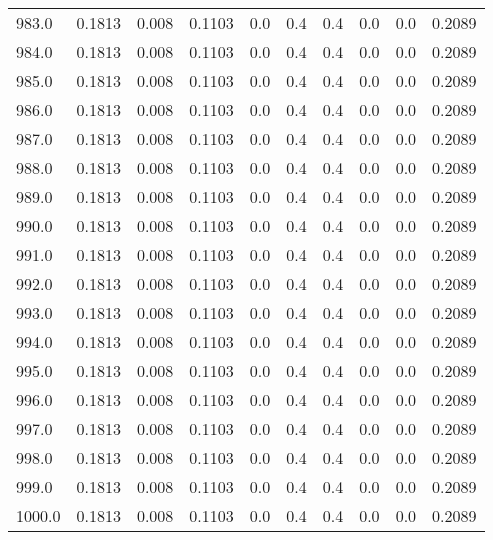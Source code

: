 \begin{longtable}{lrrrrrrrrr}
983.0 & 0.1813 & 0.008 & 0.1103 & 0.0 & 0.4 & 0.4 & 0.0 & 0.0 & 0.2089 \\
984.0 & 0.1813 & 0.008 & 0.1103 & 0.0 & 0.4 & 0.4 & 0.0 & 0.0 & 0.2089 \\
985.0 & 0.1813 & 0.008 & 0.1103 & 0.0 & 0.4 & 0.4 & 0.0 & 0.0 & 0.2089 \\
986.0 & 0.1813 & 0.008 & 0.1103 & 0.0 & 0.4 & 0.4 & 0.0 & 0.0 & 0.2089 \\
987.0 & 0.1813 & 0.008 & 0.1103 & 0.0 & 0.4 & 0.4 & 0.0 & 0.0 & 0.2089 \\
988.0 & 0.1813 & 0.008 & 0.1103 & 0.0 & 0.4 & 0.4 & 0.0 & 0.0 & 0.2089 \\
989.0 & 0.1813 & 0.008 & 0.1103 & 0.0 & 0.4 & 0.4 & 0.0 & 0.0 & 0.2089 \\
990.0 & 0.1813 & 0.008 & 0.1103 & 0.0 & 0.4 & 0.4 & 0.0 & 0.0 & 0.2089 \\
991.0 & 0.1813 & 0.008 & 0.1103 & 0.0 & 0.4 & 0.4 & 0.0 & 0.0 & 0.2089 \\
992.0 & 0.1813 & 0.008 & 0.1103 & 0.0 & 0.4 & 0.4 & 0.0 & 0.0 & 0.2089 \\
993.0 & 0.1813 & 0.008 & 0.1103 & 0.0 & 0.4 & 0.4 & 0.0 & 0.0 & 0.2089 \\
994.0 & 0.1813 & 0.008 & 0.1103 & 0.0 & 0.4 & 0.4 & 0.0 & 0.0 & 0.2089 \\
995.0 & 0.1813 & 0.008 & 0.1103 & 0.0 & 0.4 & 0.4 & 0.0 & 0.0 & 0.2089 \\
996.0 & 0.1813 & 0.008 & 0.1103 & 0.0 & 0.4 & 0.4 & 0.0 & 0.0 & 0.2089 \\
997.0 & 0.1813 & 0.008 & 0.1103 & 0.0 & 0.4 & 0.4 & 0.0 & 0.0 & 0.2089 \\
998.0 & 0.1813 & 0.008 & 0.1103 & 0.0 & 0.4 & 0.4 & 0.0 & 0.0 & 0.2089 \\
999.0 & 0.1813 & 0.008 & 0.1103 & 0.0 & 0.4 & 0.4 & 0.0 & 0.0 & 0.2089 \\
1000.0 & 0.1813 & 0.008 & 0.1103 & 0.0 & 0.4 & 0.4 & 0.0 & 0.0 & 0.2089 \\
\end{longtable}